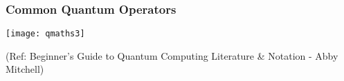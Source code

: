  \begin{frame}[fragile]\frametitle{Common Quantum Operators}

\begin{center}
\texttt{[image: qmaths3]}
\end{center}

\tiny{(Ref: Beginner’s Guide to Quantum Computing Literature \& Notation - Abby Mitchell)}

\end{frame}






